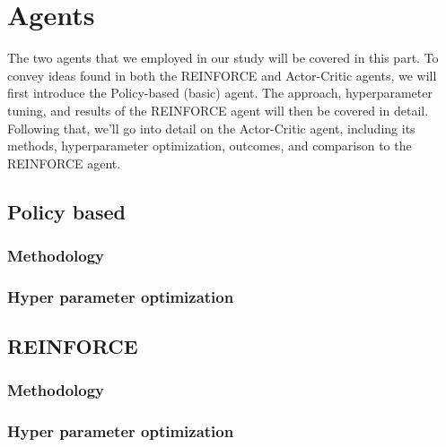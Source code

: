 \documentclass{article}
\begin{document}
\section{Agents}
The two agents that we employed in our study will be covered in this part. 
To convey ideas found in both the REINFORCE and Actor-Critic agents, we will first introduce the Policy-based (basic) agent.
The approach, hyperparameter tuning, and results of the REINFORCE agent will then be covered in detail.
Following that, we'll go into detail on the Actor-Critic agent, including its methods, hyperparameter optimization, outcomes, and comparison to the REINFORCE agent.

\subsection{Policy based}
\label{A-PolicyBased}

\subsubsection{Methodology}
\label{PB-Method}

\subsubsection{Hyper parameter optimization}
\label{PB-Method}


\subsection{REINFORCE}
\label{A-REINFORCE}


\subsubsection{Methodology}
\label{R-Method}

\subsubsection{Hyper parameter optimization}
\label{R-HPO}
\end{document}
